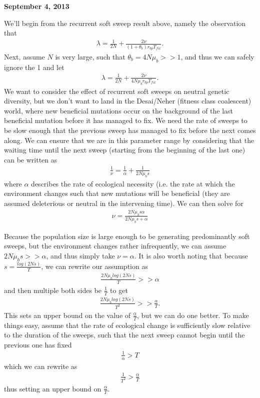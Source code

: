 \documentclass[reqno]{amsart}
\begin{document}
\begin{flushright}
	\textbf{September 4, 2013}
\end{flushright}
We'll begin from the recurrent soft sweep result above, namely the observation that
\begin{align}
	\lambda = \frac{1}{2N} + \frac{2\nu}{\left(1+\theta_b\right)r_{bp}T_{fix}}.
\end{align}
Next, assume $N$ is very large, such that $\theta_b = 4N\mu_b>>1$, and thus we can safely ignore the 1 and let
\begin{align}
	\lambda = \frac{1}{2N} + \frac{2\nu}{4N\mu_br_{bp}T_{fix}}.\label{coal.rate}
\end{align}
We want to consider the effect of recurrent soft sweeps on neutral genetic diversity, but we don't want to land in the Desai/Neher (fitness class coalescent) world, where new beneficial mutations occur on the background of the last beneficial mutation before it has managed to fix. We need the rate of sweeps to be slow enough that the previous sweep has managed to fix before the next comes along. We can ensure that we are in this parameter range by considering that the waiting time until the next sweep (starting from the beginning of the last one) can be written as
\begin{align}
	\frac{1}{\nu} = \frac{1}{\alpha} + \frac{1}{2N\mu_b s}
\end{align}
where $\alpha$ describes the rate of ecological necessity (i.e. the rate at which the environment changes such that new mutations will be beneficial (they are assumed deleterious or neutral in the intervening time). We can then solve for 
\begin{align}
	\nu = \frac{2N\mu_b s \alpha}{2N\mu_bs + \alpha}
\end{align}

Because the population size is large enough to be generating predominantly soft sweeps, but the environment changes rather infrequently, we can assume $2N\mu_bs >> \alpha$, and thus simply take $\nu=\alpha$. It is also worth noting that because $s = \frac{log(2Ns)}{T}$, we can rewrite our assumption as 
\begin{align}
	\frac{2N\mu_b log(2Ns)}{T} >> \alpha
\end{align}
and then multiple both sides be $\frac{1}{T}$ to get
\begin{align}
	\frac{2N\mu_b log(2Ns)}{T^2} >> \frac{\alpha}{T}.
\end{align}
This sets an upper bound on the value of $\frac{\alpha}{T}$, but we can do one better. To make things easy, assume that the rate of ecological change is sufficiently slow relative to the duration of the sweeps, such that the next sweep cannot begin until the previous one has fixed
\begin{align}
	\frac{1}{\alpha} > T
\end{align}
which we can rewrite as
\begin{align}
	\frac{1}{T^2}>\frac{\alpha}{T}
\end{align}
thus setting an upper bound on $\frac{\alpha}{T}$.
\end{document}
